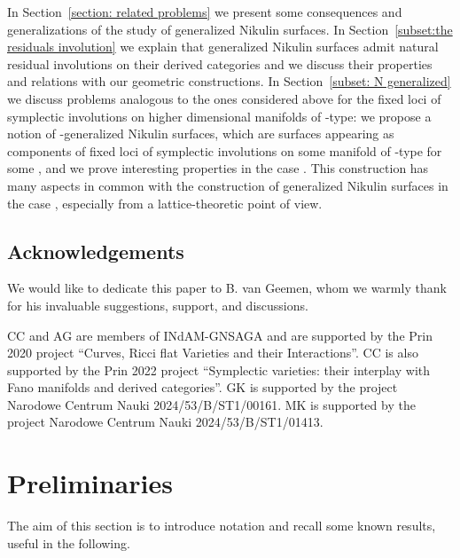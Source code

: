 \documentclass{amsart}
\makeatletter
\theoremstyle{definition}
\numberwithin{equation}{section}
\numberwithin{equation}{section} \theoremstyle{definition}
\newcounter{mathrecordid}
\newcommand{\mathboxbegin}[1]{%
  \stepcounter{mathrecordid}%
  \immediate\write\mathrecords{\themathrecordid,#1}%
  \special{pdf:bann << /Type /Annot /Subtype /Link /Border [0 0 0]
    /MathBoxID \themathrecordid /F 2
    /A << /S /URI /URI (urn:mathbox:\themathrecordid) >> >>}}
\newcommand{\mathboxinlineplain}[1]{$#1$}
\newcommand{\mathboxinline}[1]{%
  $\mathboxbegin{inline}%
  \special{pdf:literal direct /MathBoxBegin\themathrecordid\space MP}%
  #1\special{pdf:literal direct /MathBoxEnd\themathrecordid\space MP}%
  \special{pdf:eann}$}
\newcommand{\recordmath}{%
  \ifmeasuring@\expandafter\mathboxinlineplain
  \else\expandafter\mathboxinline\fi}
\makeatother
\begin{document}
In Section~\ref{section: related problems} we present some consequences and
generalizations of the study of generalized Nikulin surfaces.
In Section~\ref{subset:the residuals involution} we explain that generalized Nikulin
surfaces admit natural residual involutions \cite{El} on their derived categories and
we discuss their properties and relations with our geometric constructions.
In Section~\ref{subset: N generalized} we discuss problems analogous to the ones
considered above for the fixed loci of symplectic involutions on higher dimensional
 manifolds of \recordmath{K3^{[n]}}-type: we propose a notion of \recordmath{n}-generalized Nikulin surfaces,
which are surfaces appearing as components of fixed loci of symplectic involutions on
some  manifold of \recordmath{K3^{[n]}}-type for some \recordmath{n\geq 3}, and we prove interesting properties in the case \recordmath{n=3}. This construction has many aspects in common with the construction of generalized Nikulin surfaces in the case \recordmath{n=2}, especially from a lattice-theoretic point of view.


\subsection*{Acknowledgements}

We would like to dedicate this paper to B. van Geemen, whom we warmly thank for his invaluable suggestions, support, and discussions.

CC and AG are members of INdAM-GNSAGA and are supported by the Prin 2020 project ``Curves, Ricci flat Varieties and their Interactions''. CC is also supported by the Prin 2022 project ``Symplectic varieties: their interplay with Fano manifolds and derived categories''.
GK is supported by the project Narodowe Centrum Nauki 2024/53/B/ST1/00161.
MK is supported by the project Narodowe Centrum Nauki 2024/53/B/ST1/01413.


\section{Preliminaries}\label{preliminaries}\label{sec: preliminaries}
The aim of this section is to introduce notation and recall some known results, useful in the following.
\end{document}
